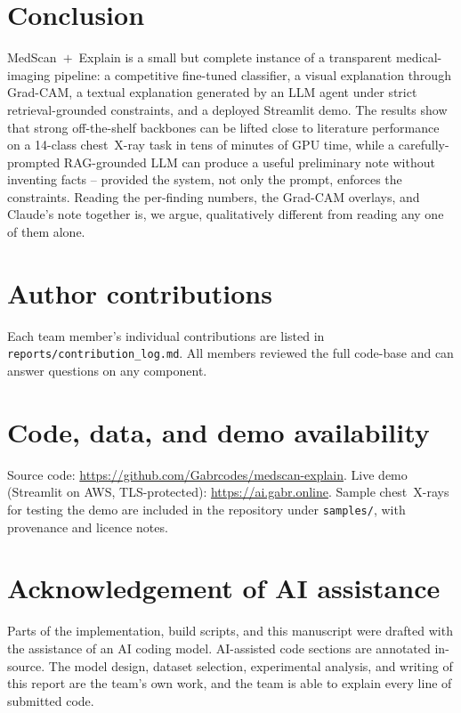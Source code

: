 \documentclass[10pt,journal,onecolumn]{IEEEtran}
\begin{document}
\section{Conclusion}

MedScan~$+$~Explain is a small but complete instance of a transparent medical-imaging pipeline: a competitive fine-tuned classifier, a visual explanation through Grad-CAM, a textual explanation generated by an LLM agent under strict retrieval-grounded constraints, and a deployed Streamlit demo. The results show that strong off-the-shelf backbones can be lifted close to literature performance on a 14-class chest~X-ray task in tens of minutes of GPU time, while a carefully-prompted RAG-grounded LLM can produce a useful preliminary note without inventing facts -- provided the system, not only the prompt, enforces the constraints. Reading the per-finding numbers, the Grad-CAM overlays, and Claude's note together is, we argue, qualitatively different from reading any one of them alone.

\section*{Author contributions}
Each team member's individual contributions are listed in \texttt{reports/contribution\_log.md}. All members reviewed the full code-base and can answer questions on any component.

\section*{Code, data, and demo availability}
Source code: \url{https://github.com/Gabrcodes/medscan-explain}. Live demo (Streamlit on AWS, TLS-protected): \url{https://ai.gabr.online}. Sample chest~X-rays for testing the demo are included in the repository under \texttt{samples/}, with provenance and licence notes.

\section*{Acknowledgement of AI assistance}
Parts of the implementation, build scripts, and this manuscript were drafted with the assistance of an AI coding model. AI-assisted code sections are annotated in-source. The model design, dataset selection, experimental analysis, and writing of this report are the team's own work, and the team is able to explain every line of submitted code.
\end{document}
